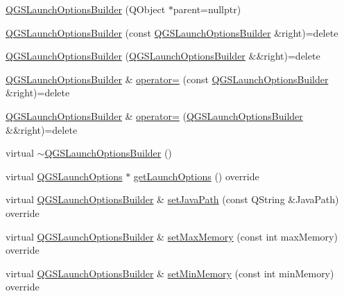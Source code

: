\begin{DoxyCompactItemize}
\item 
\mbox{\hyperlink{class_q_g_s_launch_options_builder_a39585ed49e8ec6659e2320b15b506415}{Q\+G\+S\+Launch\+Options\+Builder}} (Q\+Object $\ast$parent=nullptr)
\item 
\mbox{\hyperlink{class_q_g_s_launch_options_builder_ac330421de3c92f5561fd19d8a99563cc}{Q\+G\+S\+Launch\+Options\+Builder}} (const \mbox{\hyperlink{class_q_g_s_launch_options_builder}{Q\+G\+S\+Launch\+Options\+Builder}} \&right)=delete
\item 
\mbox{\hyperlink{class_q_g_s_launch_options_builder_af505ec52ba13b2582f46a062ed26d9ea}{Q\+G\+S\+Launch\+Options\+Builder}} (\mbox{\hyperlink{class_q_g_s_launch_options_builder}{Q\+G\+S\+Launch\+Options\+Builder}} \&\&right)=delete
\item 
\mbox{\hyperlink{class_q_g_s_launch_options_builder}{Q\+G\+S\+Launch\+Options\+Builder}} \& \mbox{\hyperlink{class_q_g_s_launch_options_builder_a0908e650dbb3d25d475892c9e68b89bd}{operator=}} (const \mbox{\hyperlink{class_q_g_s_launch_options_builder}{Q\+G\+S\+Launch\+Options\+Builder}} \&right)=delete
\item 
\mbox{\hyperlink{class_q_g_s_launch_options_builder}{Q\+G\+S\+Launch\+Options\+Builder}} \& \mbox{\hyperlink{class_q_g_s_launch_options_builder_a895b80f39047c8dedd9bb46e390859db}{operator=}} (\mbox{\hyperlink{class_q_g_s_launch_options_builder}{Q\+G\+S\+Launch\+Options\+Builder}} \&\&right)=delete
\item 
virtual \mbox{\hyperlink{class_q_g_s_launch_options_builder_a5165769e3adcee4f4e70c37c1456a6f7}{$\sim$\+Q\+G\+S\+Launch\+Options\+Builder}} ()
\item 
virtual \mbox{\hyperlink{class_q_g_s_launch_options}{Q\+G\+S\+Launch\+Options}} $\ast$ \mbox{\hyperlink{class_q_g_s_launch_options_builder_a9c8f5a5a47d197d3d1a7ba7c61b00a81}{get\+Launch\+Options}} () override
\item 
virtual \mbox{\hyperlink{class_q_g_s_launch_options_builder}{Q\+G\+S\+Launch\+Options\+Builder}} \& \mbox{\hyperlink{class_q_g_s_launch_options_builder_a4bfe1a9c72306f54ea25120cd605d090}{set\+Java\+Path}} (const Q\+String \&Java\+Path) override
\item 
virtual \mbox{\hyperlink{class_q_g_s_launch_options_builder}{Q\+G\+S\+Launch\+Options\+Builder}} \& \mbox{\hyperlink{class_q_g_s_launch_options_builder_adc04a84e5ad29c2a815577a28d3a3479}{set\+Max\+Memory}} (const int max\+Memory) override
\item 
virtual \mbox{\hyperlink{class_q_g_s_launch_options_builder}{Q\+G\+S\+Launch\+Options\+Builder}} \& \mbox{\hyperlink{class_q_g_s_launch_options_builder_ae99865719a1a7df01ce052be1fbfea5a}{set\+Min\+Memory}} (const int min\+Memory) override

\end{DoxyCompactItemize}

